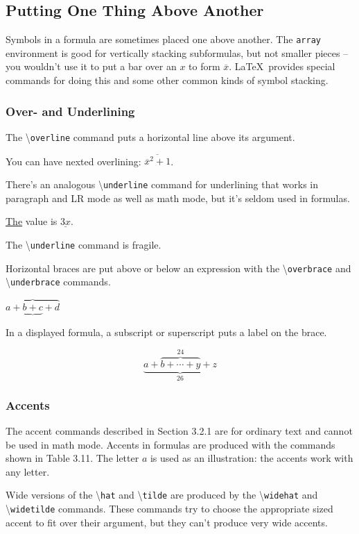 \documentclass[twocolumn]{book}        %
\begin{document}
\subsection{Putting One Thing Above Another}

Symbols in a formula are sometimes placed one above another. The \texttt{array} 
environment is good for vertically stacking subformulas, but not smaller pieces --
you wouldn't use it to put a bar over an $x$ to form $\overline x$. \LaTeX\ provides special 
commands for doing this and some other common kinds of symbol stacking.

\subsubsection{Over- and Underlining}

The \textbackslash \texttt{overline} command puts a horizontal line above its argument.

You can have nexted overlining: $\overline {\overline{x}^2 + 1}$.

There's an analogous \textbackslash \texttt{underline} command for underlining that works in paragraph 
and LR mode as well as math mode, but it's seldom used in formulas.

\underline{The} value is $\underline{3x}$.

The \textbackslash \texttt{underline} command is fragile.

Horizontal braces are put above or below an expression with the \textbackslash \texttt{overbrace} and 
\textbackslash \texttt{underbrace} commands.

\( \overbrace{a + \underbrace{b + c} + d} \)

In a displayed formula, a subscript or superscript puts a label on the brace.

\[ \underbrace{a + \overbrace{b + \cdots + y}^{24} + z }_{26} \]

\subsubsection{Accents}

The accent commands described in Section 3.2.1 are for ordinary text and cannot be used in math mode.
Accents in formulas are produced with the commands shown in Table 3.11. The letter $a$ is used as an 
illustration: the accents work with any letter.

Wide versions of the \textbackslash \texttt{hat} and \textbackslash \texttt{tilde} are produced by the 
\textbackslash \texttt{widehat} and \textbackslash \texttt{widetilde} commands. These commands try to choose 
the appropriate sized accent to fit over their argument, but they can't produce very wide accents.
\end{document}
